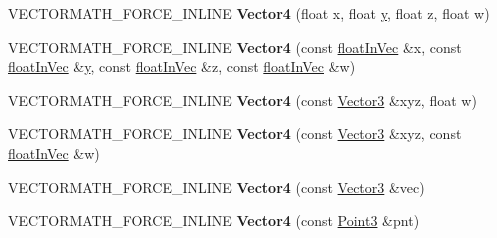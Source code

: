 \begin{DoxyCompactItemize}
\item 
\hypertarget{class_vectormath_1_1_aos_1_1_vector4_a3a4501d24f6f6c97af5ed98b457215e2}{V\+E\+C\+T\+O\+R\+M\+A\+T\+H\+\_\+\+F\+O\+R\+C\+E\+\_\+\+I\+N\+L\+I\+N\+E {\bfseries Vector4} (float x, float \hyperlink{_ice_utils_8h_aa7ffaed69623192258fb8679569ff9ba}{y}, float z, float w)}\label{class_vectormath_1_1_aos_1_1_vector4_a3a4501d24f6f6c97af5ed98b457215e2}

\item 
\hypertarget{class_vectormath_1_1_aos_1_1_vector4_ac78e78499f3fb8b5dd65d33c82ecff30}{V\+E\+C\+T\+O\+R\+M\+A\+T\+H\+\_\+\+F\+O\+R\+C\+E\+\_\+\+I\+N\+L\+I\+N\+E {\bfseries Vector4} (const \hyperlink{class_vectormath_1_1float_in_vec}{float\+In\+Vec} \&x, const \hyperlink{class_vectormath_1_1float_in_vec}{float\+In\+Vec} \&\hyperlink{_ice_utils_8h_aa7ffaed69623192258fb8679569ff9ba}{y}, const \hyperlink{class_vectormath_1_1float_in_vec}{float\+In\+Vec} \&z, const \hyperlink{class_vectormath_1_1float_in_vec}{float\+In\+Vec} \&w)}\label{class_vectormath_1_1_aos_1_1_vector4_ac78e78499f3fb8b5dd65d33c82ecff30}

\item 
\hypertarget{class_vectormath_1_1_aos_1_1_vector4_aa01a20cca631ed841fa5e7dc054d3a3b}{V\+E\+C\+T\+O\+R\+M\+A\+T\+H\+\_\+\+F\+O\+R\+C\+E\+\_\+\+I\+N\+L\+I\+N\+E {\bfseries Vector4} (const \hyperlink{class_vectormath_1_1_aos_1_1_vector3}{Vector3} \&xyz, float w)}\label{class_vectormath_1_1_aos_1_1_vector4_aa01a20cca631ed841fa5e7dc054d3a3b}

\item 
\hypertarget{class_vectormath_1_1_aos_1_1_vector4_a63194e4609276a4b76f67a6c33668e4d}{V\+E\+C\+T\+O\+R\+M\+A\+T\+H\+\_\+\+F\+O\+R\+C\+E\+\_\+\+I\+N\+L\+I\+N\+E {\bfseries Vector4} (const \hyperlink{class_vectormath_1_1_aos_1_1_vector3}{Vector3} \&xyz, const \hyperlink{class_vectormath_1_1float_in_vec}{float\+In\+Vec} \&w)}\label{class_vectormath_1_1_aos_1_1_vector4_a63194e4609276a4b76f67a6c33668e4d}

\item 
\hypertarget{class_vectormath_1_1_aos_1_1_vector4_a6294264878da234130bc0e7b932c5d6a}{V\+E\+C\+T\+O\+R\+M\+A\+T\+H\+\_\+\+F\+O\+R\+C\+E\+\_\+\+I\+N\+L\+I\+N\+E {\bfseries Vector4} (const \hyperlink{class_vectormath_1_1_aos_1_1_vector3}{Vector3} \&vec)}\label{class_vectormath_1_1_aos_1_1_vector4_a6294264878da234130bc0e7b932c5d6a}

\item 
\hypertarget{class_vectormath_1_1_aos_1_1_vector4_aa9a6005bd217cc94abd52c1265ba6eff}{V\+E\+C\+T\+O\+R\+M\+A\+T\+H\+\_\+\+F\+O\+R\+C\+E\+\_\+\+I\+N\+L\+I\+N\+E {\bfseries Vector4} (const \hyperlink{class_vectormath_1_1_aos_1_1_point3}{Point3} \&pnt)}\label{class_vectormath_1_1_aos_1_1_vector4_aa9a6005bd217cc94abd52c1265ba6eff}


\end{DoxyCompactItemize}
